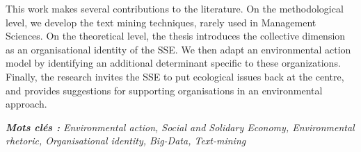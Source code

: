 This work makes several contributions to the literature. On the methodological level, we develop the text mining techniques, rarely used in Management Sciences. On the theoretical level, the thesis introduces the collective dimension as an organisational identity of the SSE. We then adapt an environmental action model by identifying an additional determinant specific to these organizations. Finally, the research invites the SSE to put ecological issues back at the centre, and provides suggestions for supporting organisations in an environmental approach.\\ 

\vspace{1cm}

\textit{\textbf{Mots clés :} Environmental action, Social and Solidary Economy, Environmental rhetoric, Organisational identity, Big-Data, Text-mining}

\selectfont{}
\renewcommand*{\arraystretch}{1.5}
